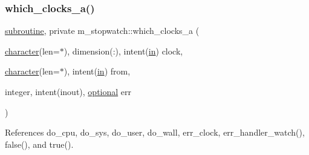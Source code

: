 \subsubsection{\texorpdfstring{which\+\_\+clocks\+\_\+a()}{which\_clocks\_a()}}
{\footnotesize\ttfamily \hyperlink{M__stopwatch_83_8txt_acfbcff50169d691ff02d4a123ed70482}{subroutine}, private m\+\_\+stopwatch\+::which\+\_\+clocks\+\_\+a (\begin{DoxyParamCaption}\item[{\hyperlink{option__stopwatch_83_8txt_abd4b21fbbd175834027b5224bfe97e66}{character}(len=$\ast$), dimension(\+:), intent(\hyperlink{M__journal_83_8txt_afce72651d1eed785a2132bee863b2f38}{in})}]{clock,  }\item[{\hyperlink{option__stopwatch_83_8txt_abd4b21fbbd175834027b5224bfe97e66}{character}(len=$\ast$), intent(\hyperlink{M__journal_83_8txt_afce72651d1eed785a2132bee863b2f38}{in})}]{from,  }\item[{integer, intent(inout), \hyperlink{option__stopwatch_83_8txt_aa4ece75e7acf58a4843f70fe18c3ade5}{optional}}]{err }\end{DoxyParamCaption})\hspace{0.3cm}{\ttfamily [private]}}



References do\+\_\+cpu, do\+\_\+sys, do\+\_\+user, do\+\_\+wall, err\+\_\+clock, err\+\_\+handler\+\_\+watch(), false(), and true().

